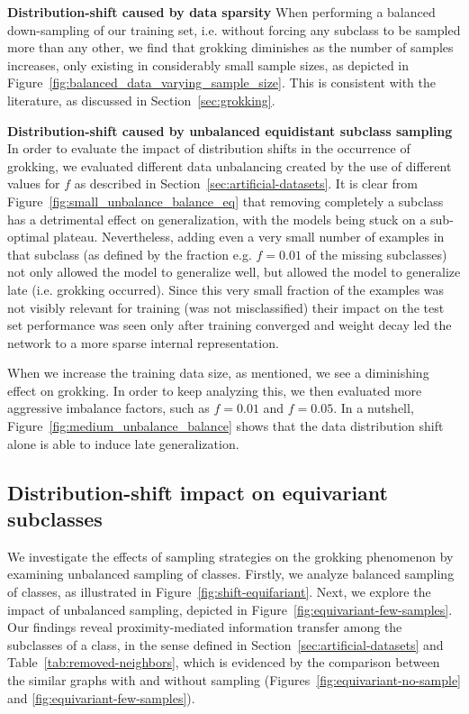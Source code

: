 ﻿\documentclass[../ppgc-tese.tex]{subfiles}
\begin{document}
\textbf{Distribution-shift caused by data sparsity} When performing a balanced down-sampling of our training set, i.e. without forcing any subclass to be sampled more than any other, we find that grokking diminishes as the number of samples increases, only existing in considerably small sample sizes, as depicted in Figure~\ref{fig:balanced_data_varying_sample_size}. This is consistent with the literature, as discussed in Section~\ref{sec:grokking}.

\textbf{Distribution-shift caused by unbalanced equidistant subclass sampling}
In order to evaluate the impact of distribution shifts in the  occurrence of grokking, we evaluated different data unbalancing created by the use of different values for $f$ as described in Section~\ref{sec:artificial-datasets}. It is clear from Figure~\ref{fig:small_unbalance_balance_eq} that removing completely a subclass has a detrimental effect on generalization, with the models being stuck on a sub-optimal plateau. Nevertheless, adding even a very small number of examples in that subclass (as defined by the fraction e.g. $f = 0.01$ of the missing subclasses) not only allowed the model to generalize well, but allowed the model to generalize late (i.e. grokking occurred). Since this very small fraction of the examples was not visibly relevant for training (was not misclassified) their impact on the test set performance was seen only after training converged and weight decay led the network to a more sparse internal representation.

When we increase the training data size, as mentioned, we see a diminishing effect on grokking. In order to keep analyzing this, we then evaluated more aggressive imbalance factors, such as $f = 0.01$ and $f = 0.05$. In a nutshell, Figure~\ref{fig:medium_unbalance_balance} shows that the data distribution shift alone is able to induce late generalization.

\subsection{Distribution-shift impact on equivariant subclasses}
We investigate the effects of sampling strategies on the grokking phenomenon by examining unbalanced sampling of classes. Firstly, we analyze balanced sampling of classes, as illustrated in Figure~\ref{fig:shift-equifariant}. Next, we explore the impact of unbalanced sampling, depicted in Figure~\ref{fig:equivariant-few-samples}. Our findings reveal proximity-mediated information transfer among the subclasses of a class, in the sense defined in Section~\ref{sec:artificial-datasets} and Table~\ref{tab:removed-neighbors}, which is evidenced by the comparison between the similar graphs with and without sampling (Figures~\ref{fig:equivariant-no-sample} and \ref{fig:equivariant-few-samples}).
\end{document}
